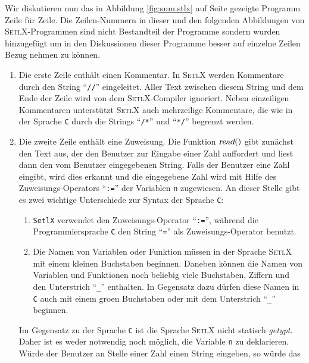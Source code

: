 Wir diskutieren nun das in Abbildung \ref{fig:sum.stlx} auf Seite \pageref{fig:sum.stlx} gezeigte Programm
Zeile f\"{u}r Zeile.  Die Zeilen-Nummern in dieser und den folgenden Abbildungen von \textsc{SetlX}-Programmen
sind nicht Bestandteil der Programme sondern wurden hinzugef\"{u}gt um in den Diskussionen
dieser Programme besser auf einzelne Zeilen Bezug nehmen zu k\"{o}nnen. 
\begin{enumerate}
\item Die erste Zeile enth\"{a}lt einen Kommentar.  In \textsc{SetlX} werden Kommentare
      durch den String ``\texttt{//}'' eingeleitet.  Aller Text zwischen diesem String und
      dem Ende der Zeile wird von dem \textsc{SetlX}-Compiler ignoriert.  Neben
      einzeiligen Kommentaren unterst\"{u}tzt \textsc{SetlX} auch mehrzeilige Kommentare, die
      wie in der Sprache \texttt{C} durch die Strings ``\texttt{/*}'' und ``\texttt{*/}''
      begrenzt werden.
\item Die zweite Zeile enth\"{a}lt eine Zuweisung.  Die Funktion $\textsl{read}()$ gibt
      zun\"{a}chst den Text aus, der den Benutzer zur Eingabe einer Zahl auffordert und liest dann
      den vom Benutzer eingegebenen String.  Falls der Benutzer eine Zahl eingibt, wird
      dies erkannt und die eingegebene Zahl wird mit Hilfe des
      Zuweisungs-Operators ``\texttt{:=}'' der Variablen \texttt{n} zugewiesen.
      An dieser Stelle gibt es zwei wichtige Unterschiede zur Syntax der Sprache
      \texttt{C}:
      \begin{enumerate}
      \item \texttt{SetlX} verwendet den Zuweisungs-Operator ``\texttt{:=}'', w\"{a}hrend
            die Programmiersprache \texttt{C} den String ``\texttt{=}'' als
            Zuweisungs-Operator benutzt.
      \item Die Namen von Variablen oder Funktion m\"{u}ssen in der Sprache \textsc{SetlX} mit einem
            kleinen Buchstaben beginnen.  Daneben k\"{o}nnen die Namen von  Variablen und Funktionen
            noch beliebig viele Buchstaben, Ziffern und den Unterstrich ``\texttt{\_}'' enthalten.
            In Gegensatz dazu d\"{u}rfen diese Namen in \texttt{C} auch mit einem gro\3en
            Buchstaben oder mit dem Unterstrich ``\texttt{\_}'' beginnen.  
      \end{enumerate}
      Im Gegensatz zu der Sprache \texttt{C} ist die Sprache \textsc{SetlX} nicht statisch
      \emph{getypt}. Daher ist es weder notwendig noch m\"{o}glich, die Variable \texttt{n} zu
      deklarieren.  W\"{u}rde der Benutzer an Stelle einer Zahl einen String eingeben, so w\"{u}rde das

\end{enumerate}
